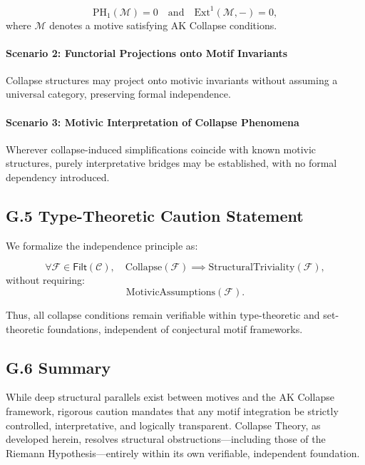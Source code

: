 \documentclass[11pt]{article}
\begin{document}
\[
\mathrm{PH}_1(\mathcal{M}) = 0 \quad \text{and} \quad \mathrm{Ext}^1(\mathcal{M}, -) = 0,
\]
where $\mathcal{M}$ denotes a motive satisfying AK Collapse conditions.

\paragraph{Scenario 2: Functorial Projections onto Motif Invariants}  
Collapse structures may project onto motivic invariants without assuming a universal category, preserving formal independence.

\paragraph{Scenario 3: Motivic Interpretation of Collapse Phenomena}  
Wherever collapse-induced simplifications coincide with known motivic structures, purely interpretative bridges may be established, with no formal dependency introduced.

\subsection*{G.5 Type-Theoretic Caution Statement}

We formalize the independence principle as:

\[
\forall \mathcal{F} \in \mathsf{Filt}(\mathcal{C}), \quad 
\mathrm{Collapse}(\mathcal{F}) \implies \mathrm{StructuralTriviality}(\mathcal{F}),
\]
without requiring:
\[
\mathrm{MotivicAssumptions}(\mathcal{F}).
\]

Thus, all collapse conditions remain verifiable within type-theoretic and set-theoretic foundations, independent of conjectural motif frameworks.

\subsection*{G.6 Summary}

While deep structural parallels exist between motives and the AK Collapse framework, rigorous caution mandates that any motif integration be strictly controlled, interpretative, and logically transparent. Collapse Theory, as developed herein, resolves structural obstructions—including those of the Riemann Hypothesis—entirely within its own verifiable, independent foundation.



\end{document}
